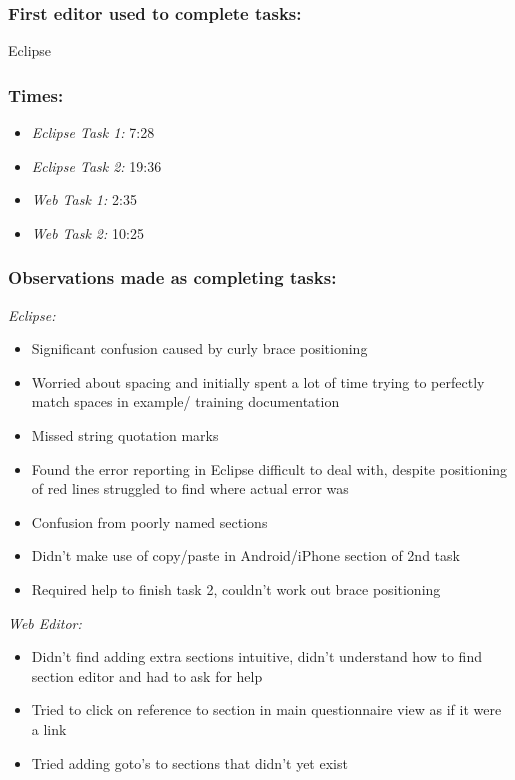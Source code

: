 \subsubsection*{First editor used to complete tasks:} Eclipse
\subsubsection*{Times:}
\begin{itemize}
\item \emph{Eclipse Task 1:} 7:28
\item \emph{Eclipse Task 2:} 19:36
\item \emph{Web Task 1:} 2:35
\item \emph{Web Task 2:} 10:25
\end{itemize}
\subsubsection*{Observations made as completing tasks:}

\emph{Eclipse:}
\begin{itemize}
\item Significant confusion caused by curly brace positioning
\item Worried about spacing and initially spent a lot of time trying to perfectly match spaces in example/ training documentation
\item Missed string quotation marks
\item Found the error reporting in Eclipse difficult to deal with, despite positioning of red lines struggled to find where actual error was
\item Confusion from poorly named sections
\item Didn't make use of copy/paste in Android/iPhone section of 2nd task
\item Required help to finish task 2, couldn't work out brace positioning
\end{itemize}
\emph{Web Editor:}
\begin{itemize}
\item Didn't find adding extra sections intuitive, didn't understand how to find section editor and had to ask for help
\item Tried to click on reference to section in main questionnaire view as if it were a link
\item Tried adding goto's to sections that didn't yet exist
\end{itemize}

